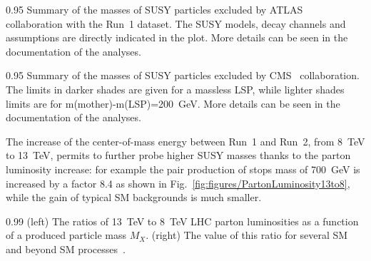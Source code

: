                  {0.95}       %
                 {Summary of the masses of SUSY particles excluded by ATLAS~\cite{website:SUSYresRunIATLAS} collaboration with the Run~1 dataset. The SUSY models, decay channels and assumptions are directly indicated in the plot. More details can be seen in the documentation of the analyses. }


                 {0.95}       %
                 {Summary of the masses of SUSY particles excluded by CMS~\cite{website:SUSYresRunI} collaboration. The limits in darker shades are given for a massless LSP, while lighter shades limits are for m(mother)-m(LSP)=200~GeV. More details can be seen in the documentation of the analyses. }

The increase of the center-of-mass energy between Run~1 and Run~2, from 8~TeV to 13~TeV, permits to further probe higher SUSY masses thanks to  the parton luminosity increase: for example the pair production of stops mass of 700~GeV is increased by a factor 8.4 as shown in Fig.~\ref{fig:figures/PartonLuminosity13to8}, while the gain of typical SM backgrounds is much smaller.

                 {0.99}       %
                 {(left) The ratios of 13~TeV to 8~TeV LHC parton luminosities as a function of a produced particle mass $M_{X}$. (right) The value of this ratio for several SM and beyond SM processes~\cite{Hoecker:2236645}.}




